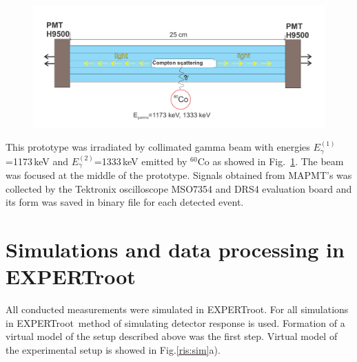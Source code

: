 \documentclass{webofc}
\newcommand{\er}{\textmd{EXPERTroot}}
\begin{document}
\begin{figure}[h]
	\centering
	\includegraphics[width=1\linewidth]{NeuRadexperiment.png}
	\label{ris:neuradexp}
\end{figure}

This prototype was irradiated by collimated gamma beam with energies $E^{(1)}_{\gamma}$=1173\,keV and $E^{(2)}_{\gamma}$=1333\,keV emitted by $^{60}$Co as showed in Fig.~\ref{ris:neuradexp}. The beam was focused at the middle of the prototype. Signals obtained from MAPMT's was collected by the Tektronix oscilloscope MSO7354 and DRS4 evaluation board and its form was saved in binary file for each detected event.

\section{Simulations and data processing in EXPERTroot}

	All conducted measurements were simulated in \er. For all simulations in \er\, method of simulating detector response \cite{er} is used.
	Formation of a virtual model of the setup described above was the first step.
	Virtual model of the experimental setup is showed in Fig.\ref{ris:sim}a). 
	
\end{document}

